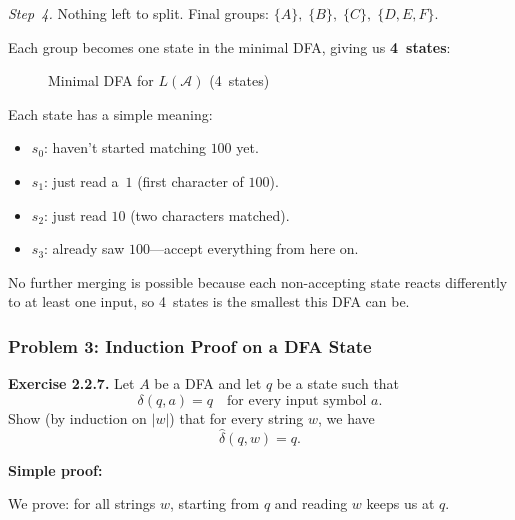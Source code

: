 \documentclass{article}
\theoremstyle{theorem}
\theoremstyle{definition}
\theoremstyle{remark}
\begin{document}
\emph{Step~4.} Nothing left to split. Final groups: $\{A\},\; \{B\},\; \{C\},\; \{D,E,F\}$.

Each group becomes one state in the minimal DFA, giving us \textbf{4~states}:

\begin{figure}[H]
  \centering
  \caption{Minimal DFA for $L(\mathcal{A})$ (4~states)}
\end{figure}

Each state has a simple meaning:
\begin{itemize}
  \item $s_0$: haven't started matching $100$ yet.
  \item $s_1$: just read a~$1$ (first character of $100$).
  \item $s_2$: just read $10$ (two characters matched).
  \item $s_3$: already saw $100$---accept everything from here on.
\end{itemize}
No further merging is possible because each non-accepting state reacts differently to at least one input, so 4~states is the smallest this DFA can be.

\subsubsection{Problem 3: Induction Proof on a DFA State}

\textbf{Exercise 2.2.7.} Let $A$ be a DFA and let $q$ be a state such that
\[
\delta(q,a)=q \quad \text{for every input symbol } a.
\]
Show (by induction on $|w|$) that for every string $w$, we have
\[
\hat{\delta}(q,w)=q.
\]

\textbf{Simple proof:}

We prove: for all strings $w$, starting from $q$ and reading $w$ keeps us at $q$.
\end{document}
